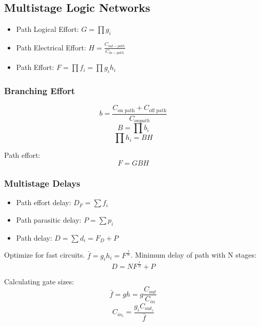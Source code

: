 \subsection{Multistage Logic Networks}
\begin{itemize}
    \item Path Logical Effort: $G = \prod g_i$
    \item Path Electrical Effort: $H = \frac{C_{out-path}}{C_{in-path}}$
    \item Path Effort: $F = \prod f_i = \prod g_i h_i$
\end{itemize}

    \subsubsection{Branching Effort}
    \begin{equation}
        b = \frac{C_{\text{on path}} + C_{\text{off path}}}{C_{on path}}
    \end{equation}
    \begin{equation}
        B = \prod b_i
    \end{equation}
    \begin{equation}
        \prod h_i = BH
    \end{equation}

Path effort:
\begin{equation}
    F = GBH
\end{equation}
    \subsubsection{Multistage Delays}
    \begin{itemize}
        \item Path effort delay: $D_F = \sum f_i$
        \item Path parasitic delay: $P = \sum p_i$ 
        \item Path delay: $D = \sum d_i = F_D + P$
    \end{itemize}

Optimize for fast circuits. $\bar{f} = g_ih_i = F^{\frac{1}{N}}$. Minimum delay of path with N stages:
\begin{equation}
    D = NF^{\frac{1}{N}} + P
\end{equation}

Calculating gate sizes:
\begin{equation}
    \bar{f} = gh = g \frac{C_{out}}{C_{in}}
\end{equation}
\begin{equation}
    C_{in_i} = \frac{g_i C_{out_i}}{\bar{f}}
\end{equation}

